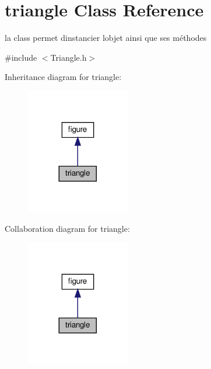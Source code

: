 \hypertarget{classtriangle}{}\section{triangle Class Reference}
\label{classtriangle}


la class permet d\textquotesingle{}instancier l\textquotesingle{}objet ainsi que ses méthodes  




{\ttfamily \#include $<$Triangle.\+h$>$}



Inheritance diagram for triangle\+:
\nopagebreak
\begin{figure}[H]
\begin{center}
\leavevmode
\includegraphics[width=128pt]{classtriangle__inherit__graph}
\end{center}
\end{figure}


Collaboration diagram for triangle\+:
\nopagebreak
\begin{figure}[H]
\begin{center}
\leavevmode
\includegraphics[width=128pt]{classtriangle__coll__graph}
\end{center}
\end{figure}
